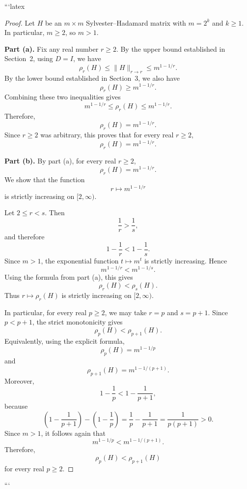 ```latex
\begin{proof}
Let $H$ be an $m \times m$ Sylvester--Hadamard matrix with $m = 2^k$ and $k \geq 1$. In particular, $m \geq 2$, so $m > 1$.

\medskip

\noindent\textbf{Part (a).}
Fix any real number $r \geq 2$. By the upper bound established in Section~2, using $D = I$, we have
\[
\rho_r(H) \leq \|H\|_{r \to r} \leq m^{1 - 1/r}.
\]
By the lower bound established in Section~3, we also have
\[
\rho_r(H) \geq m^{1 - 1/r}.
\]
Combining these two inequalities gives
\[
m^{1 - 1/r} \leq \rho_r(H) \leq m^{1 - 1/r}.
\]
Therefore,
\[
\rho_r(H) = m^{1 - 1/r}.
\]
Since $r \geq 2$ was arbitrary, this proves that for every real $r \geq 2$,
\[
\boxed{\rho_r(H) = m^{1 - 1/r}}.
\]

\medskip

\noindent\textbf{Part (b).}
By part (a), for every real $r \geq 2$,
\[
\rho_r(H) = m^{1 - 1/r}.
\]
We show that the function
\[
r \mapsto m^{1 - 1/r}
\]
is strictly increasing on $[2,\infty)$.

Let $2 \leq r < s$. Then
\[
\frac{1}{r} > \frac{1}{s},
\]
and therefore
\[
1 - \frac{1}{r} < 1 - \frac{1}{s}.
\]
Since $m > 1$, the exponential function $t \mapsto m^t$ is strictly increasing. Hence
\[
m^{1 - 1/r} < m^{1 - 1/s}.
\]
Using the formula from part (a), this gives
\[
\rho_r(H) < \rho_s(H).
\]
Thus $r \mapsto \rho_r(H)$ is strictly increasing on $[2,\infty)$.

In particular, for every real $p \geq 2$, we may take $r = p$ and $s = p+1$. Since $p < p+1$, the strict monotonicity gives
\[
\rho_p(H) < \rho_{p+1}(H).
\]
Equivalently, using the explicit formula,
\[
\rho_p(H) = m^{1 - 1/p}
\]
and
\[
\rho_{p+1}(H) = m^{1 - 1/(p+1)}.
\]
Moreover,
\[
1 - \frac{1}{p}
<
1 - \frac{1}{p+1},
\]
because
\[
\left(1 - \frac{1}{p+1}\right)
-
\left(1 - \frac{1}{p}\right)
=
\frac{1}{p} - \frac{1}{p+1}
=
\frac{1}{p(p+1)}
>
0.
\]
Since $m > 1$, it follows again that
\[
m^{1 - 1/p} < m^{1 - 1/(p+1)}.
\]
Therefore,
\[
\boxed{\rho_p(H) < \rho_{p+1}(H)}
\]
for every real $p \geq 2$.
\end{proof}
```